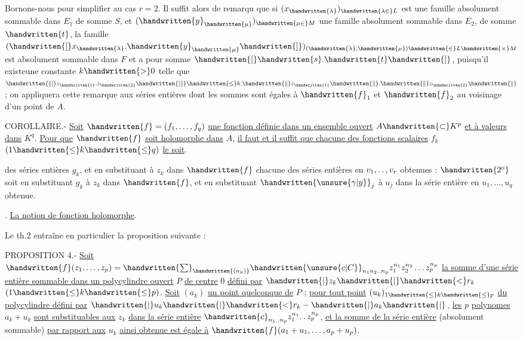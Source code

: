 Bornons-nous pour simplifier au cas $r=2$. Il suffit alors de remarqu que si $(x_{\handwritten{\lambda}})_{\handwritten{\lambda\in}L}$ est une famille absolument sommable dans $E_1$ de somme $S$, et $(\handwritten{y}_{\handwritten{\mu}})_{\handwritten{\mu\in}M}$ une famille absolument sommable dans $E_2$, de somme $\handwritten{t}$, la famille $(\handwritten{[}x_{\handwritten{\lambda}}.\handwritten{y}_{\handwritten{\mu}}\handwritten{]})_{(\handwritten{\lambda},\handwritten{\mu})\handwritten{\in}L\handwritten{\times}M}$ est absolument sommable dans $F$ et a pour somme $\handwritten{[}\handwritten{s}.\handwritten{t}\handwritten{]}$, puisqu'il existeune constante $k\handwritten{>}0$ telle que $\handwritten{\|[}z_{\handwritten{1}}.z_{\handwritten{2}}\handwritten{]\|}\handwritten{\leq}k.\handwritten{\|}z_{\handwritten{1}}\handwritten{\|}.\handwritten{\|}z_{\handwritten{2}}\handwritten{\|}$ ; on appliquera cette remarque aux séries entières dont les sommes sont égales à $\handwritten{f}_1$ et $\handwritten{f}_2$ au voisinage d'un point de $A$.

COROLLAIRE.- \uline{Soit} $\handwritten{f}=(f_1,\ldots,f_q)$ \uline{une fonction définie dans un ensemble ouvert} $A\handwritten{\subset}K^p$ \uline{et à valeurs dans} $K^q$. \uline{Pour que} $\handwritten{f}$ \uline{soit holomorphe dans} $A$, \uline{il faut et il suffit que chacune des fonctions scalaires} $f_k$ $(1\handwritten{\leq}k\handwritten{\leq}q)$ \uline{le soit}.


 des séries entières $g_k$, et en substituant à $z_k$ dans $\handwritten{f}$ chacune des séries entières en $v_1,\ldotp\ldotp,v_r$ obtenues : $\handwritten{2^{\mathrm{o}}}$ soit en substituant $g_k$ à $z_k$ dans $\handwritten{f}$, et en substituant $\handwritten{\unsure{\gamma|y}}_j$ à $u_j$ dans la série entière en $u_1,\ldots,u_q$ obtenue.

\uline{}. \uline{La notion de fonction holomorphe}.

Le th.2 entraîne en particulier la proposition suivante :

PROPOSITION 4.- \uline{Soit} $\handwritten{f}(z_1,\ldots,z_p)=\handwritten{\sum}_{\handwritten{(n_k)}}\handwritten{\unsure{c|C}}_{n_1n_2\ldotp\ldotp n_p}z_1^{n_1}z_2^{n_2}\ldots z_p^{n_p}$ \uline{la somme d'une série entière sommable dans un polycylindre ouvert} $P$ \uline{de centre} $0$ \uline{défini par} $\handwritten{|}z_k\handwritten{|}\handwritten{<}r_k$ $(1\handwritten{\leq}k\handwritten{\leq}p)$. \uline{Soit} $(a_k)$ \uline{un point quelconque de} $P$ ; \uline{pour tout point} $(u_k)_{1\handwritten{\leq}k\handwritten{\leq}p}$ \uline{du polycylindre défini par} $\handwritten{|}u_k\handwritten{|}\handwritten{<}r_k-\handwritten{|}a_k\handwritten{|}$, \uline{les} $p$ \uline{polynomes} $a_k+u_k$ \uline{sont substituables aux} $z_k$ \uline{dans la série entière} $\handwritten{c}_{n_1\ldotp\ldotp n_p}z_1^{n_1}\ldotp\ldotp z_p^{n_p}$, \uline{et la somme de la série entière} (absolument sommable) \uline{par rapport aux} $u_k$ \uline{ainsi obtenue est égale à} $\handwritten{f}(a_1+u_1,\ldots,a_p+u_p)$.

